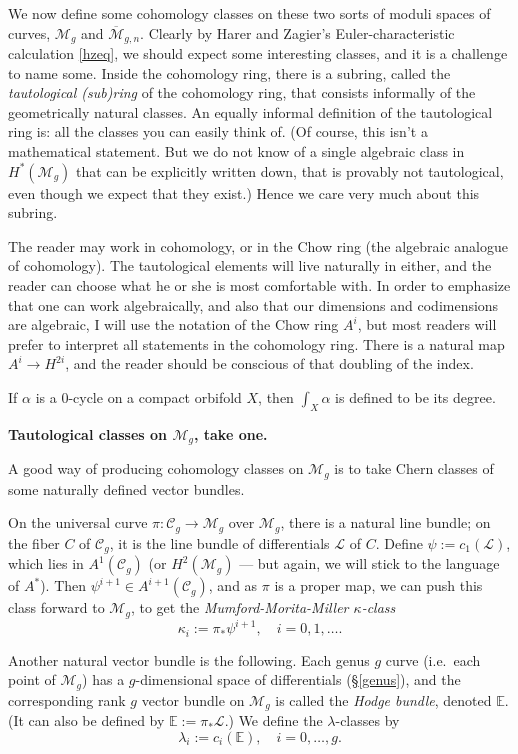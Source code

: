\documentclass[12pt,letterpaper]{amsart}
\newcommand{\bpoint}[1]{\vspace{3mm}\par \noindent \refstepcounter{subsection}{\bf \thesubsection.} 
  {\bf #1.} }
\newcommand{\E}{\mathbb{E}}
\newcommand{\ka}{\kappa}
\newcommand{\cC}{{\mathcal{C}}}
\renewcommand{\cL}{{\mathcal{L}}}
\newcommand{\cm}{{\mathcal{M}}}
\newcommand{\cmbar}{\overline{\cm}}
\newcommand{\al}{\alpha}
\newcommand{\la}{\lambda}
\newcommand{\lremind}[1]{{\bf[label:  #1]}}
\renewcommand{\lremind}[1]{{}}
\begin{document}
{We now define some cohomology classes on these two sorts of moduli
spaces of curves, $\cm_g$ and $\cmbar_{g,n}$.  Clearly by Harer and
Zagier's Euler-characteristic calculation \eqref{hzeq}, we should
expect some interesting classes, and it is a challenge to name some.
Inside the cohomology ring, there is a subring, called the {\em
  tautological (sub)ring} of the cohomology ring, that consists
informally of the geometrically natural classes.  An equally informal
definition of the tautological ring is: all the classes you can easily
think of.  (Of course, this isn't a mathematical statement.  But we do
not know of a single algebraic class in $H^*(\cm_g)$ that can be
explicitly written down, that is provably not tautological, even
though we expect that they exist.)  Hence we care very much about this
subring.

The reader may work in cohomology, or in the Chow ring (the algebraic
analogue of cohomology).  The tautological elements will live
naturally in either, and the reader can choose what he or she is most
comfortable with.    In order to emphasize that one can work algebraically,
and also that our dimensions and codimensions are algebraic, I will
use the notation of the Chow ring $A^i$, but most readers
will prefer to interpret all statements in the cohomology ring.
There is a natural map $A^i \rightarrow H^{2i}$, and the reader
should be conscious of that doubling of the index.

If $\al$ is a $0$-cycle on a compact orbifold $X$, then $\int_X
\al$ is defined to be its degree.

\bpoint{Tautological classes on $\cm_g$, take one} \label{taut1}\lremind{taut1}

A good way of producing cohomology classes on $\cm_g$ is to take
Chern classes of some naturally defined vector bundles.

On the universal curve $\pi: \cC_g \rightarrow \cm_g$ over $\cm_g$,
there is a natural line bundle; on the fiber $C$ of $\cC_g$, it is the
line bundle of differentials $\cL$ of $C$.  Define $\psi := c_1(\cL)$, which
lies in $A^1(\cC_g)$ (or $H^2(\cm_g)$ --- but again, we will stick to the
language of $A^*$).  Then $\psi^{i+1} \in A^{i+1}(\cC_g)$, and as $\pi$
is a proper map, we can push this class forward to
$\cm_g$, to get the {\em Mumford-Morita-Miller $\ka$-class}
$$
\boxed{\ka_i := \pi_* \psi^{i+1}, \quad i= 0, 1, \dots.}$$


Another natural vector bundle is the following.
Each genus $g$ curve (i.e.\ each point of $\cm_g$)  has a $g$-dimensional space of
differentials (\S \ref{genus}), and the corresponding  rank $g$ vector bundle
on $\cm_g$ is called the {\em Hodge bundle}, denoted $\E$.
(It can also be defined by $\E := \pi_* \cL$.)  
We define the $\la$-classes by
$$
\boxed{\la_i := c_i(\E), \quad i = 0, \dots, g.}
$$

}
\end{document}

